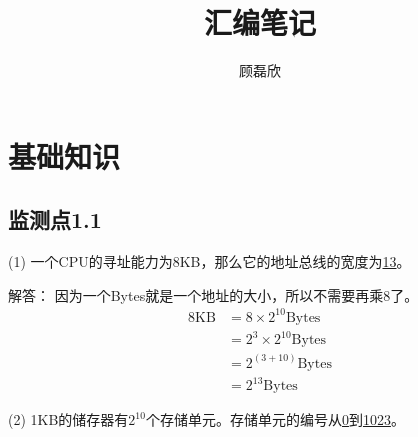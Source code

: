 \documentclass{elegantnote}
\title{汇编笔记}
\author{顾磊欣}
\begin{document}
    \maketitle
    \section{基础知识}
    \subsection*{监测点1.1}
    (1) 一个CPU的寻址能力为8KB，那么它的地址总线的宽度为\underline{13}。\par
    解答：
    因为一个Bytes就是一个地址的大小，所以不需要再乘8了。
    \begin{align*}
        8\text{KB}&= 8\times2^{10}\text{Bytes} \\
        & =2^3\times2^{10}\text{Bytes} \\
        & = 2^{(3+10)}\text{Bytes} \\
        & = 2^{13}\text{Bytes}
    \end{align*}\par
    (2) 1KB的储存器有\underline{$2^{10}$}个存储单元。存储单元的编号从\underline{0}到\underline{1023}。\par
    
\end{document}
